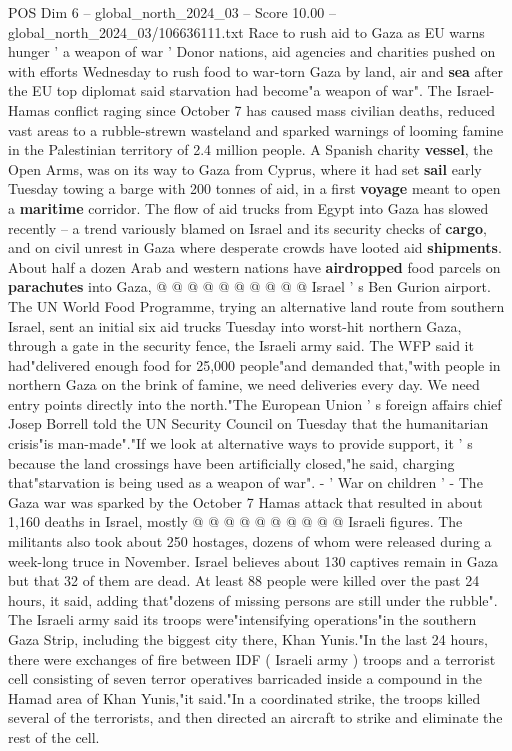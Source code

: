 \begin{textsample}{POS Dim 6 – global\_north\_2024\_03 – Score 10.00 – global\_north\_2024\_03/106636111.txt}  \label{ex:f6_pos_054}
Race to rush aid to Gaza as EU warns hunger ' a weapon of war ' Donor nations, aid agencies and charities pushed on with efforts Wednesday to rush food to war-torn Gaza by land, air and \textbf{sea} after the EU top diplomat said starvation had become"a weapon of war".
The Israel-Hamas conflict raging since October 7 has caused mass civilian deaths, reduced vast areas to a rubble-strewn wasteland and sparked warnings of looming famine in the Palestinian territory of 2.4 million people.
A Spanish charity \textbf{vessel}, the Open Arms, was on its way to Gaza from Cyprus, where it had set \textbf{sail} early Tuesday towing a barge with 200 tonnes of aid, in a first \textbf{voyage} meant to open a \textbf{maritime} corridor.
The flow of aid trucks from Egypt into Gaza has slowed recently -- a trend variously blamed on Israel and its security checks of \textbf{cargo}, and on civil unrest in Gaza where desperate crowds have looted aid \textbf{shipments}.
About half a dozen Arab and western nations have \textbf{airdropped} food parcels on \textbf{parachutes} into Gaza, @ @ @ @ @ @ @ @ @ @ Israel ' s Ben Gurion airport.
The UN World Food Programme, trying an alternative land route from southern Israel, sent an initial six aid trucks Tuesday into worst-hit northern Gaza, through a gate in the security fence, the Israeli army said.
The WFP said it had"delivered enough food for 25,000 people"and demanded that,"with people in northern Gaza on the brink of famine, we need deliveries every day.
We need entry points directly into the north."The European Union ' s foreign affairs chief Josep Borrell told the UN Security Council on Tuesday that the humanitarian crisis"is man-made"."If we look at alternative ways to provide support, it ' s because the land crossings have been artificially closed,"he said, charging that"starvation is being used as a weapon of war". - ' War on children ' - The Gaza war was sparked by the October 7 Hamas attack that resulted in about 1,160 deaths in Israel, mostly @ @ @ @ @ @ @ @ @ @ Israeli figures.
The militants also took about 250 hostages, dozens of whom were released during a week-long truce in November.
Israel believes about 130 captives remain in Gaza but that 32 of them are dead.
At least 88 people were killed over the past 24 hours, it said, adding that"dozens of missing persons are still under the rubble".
The Israeli army said its troops were"intensifying operations"in the southern Gaza Strip, including the biggest city there, Khan Yunis."In the last 24 hours, there were exchanges of fire between IDF ( Israeli army ) troops and a terrorist cell consisting of seven terror operatives barricaded inside a compound in the Hamad area of Khan Yunis,"it said."In a coordinated strike, the troops killed several of the terrorists, and then directed an aircraft to strike and eliminate the rest of the cell.

\end{textsample}

